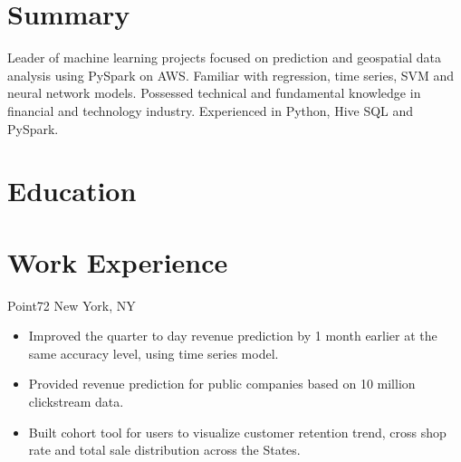 \documentclass[11pt,a4paper,roman]{moderncv} %
\begin{document}
\makecvtitle %

\section{Summary}  {\small Leader of machine learning projects focused on prediction and geospatial data analysis using PySpark on AWS. Familiar with regression, time series, SVM and neural network models. Possessed technical and fundamental knowledge in financial and technology industry. Experienced in Python, Hive SQL and PySpark.}

\section{Education}


\section{Work Experience}
{Point72}
{New York, NY}{}
{\begin{itemize}  %
	\item Improved the quarter to day revenue prediction by 1 month earlier at the same accuracy level, using time series model.
	\item Provided revenue prediction for public companies based on 10 million clickstream data.
	\item Built cohort tool for users to visualize customer retention trend, cross shop rate and total sale distribution across the States.
\end{itemize}}
\end{document}
